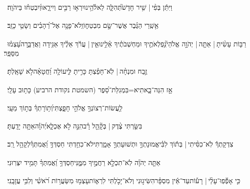 \documentclass[12pt]{article}
\newcommand{\loc}[1]{\textsuperscript{\locf{#1}}}
\begin{document}
{\loc{ ד}~}‏וַיִּתֵּ֬ן בְּפִ֨י |  שִׁ֥יר חָדָשׁ֮{\hfill}תְּהִלָּ֢ה לֵאלֹ֫הֵ֥ינוּ\newline\hspace*{.5em}יִרְא֣וּ רַבִּ֣ים וְיִירָ֑אוּ{\hfill}וְ֝יִבְטְח֗וּ בַּיהֹוָֽה׃\par

{\loc{ ה}~}‏אַ֥שְֽׁרֵי הַגֶּ֗בֶר אֲשֶׁר־שָׂ֣ם  מִבְטַח֑וֹ{\hfill}וְֽלֹא־פָנָ֥ה אֶל־רְ֝הָבִ֗ים וְשָׂטֵ֥י כָזָֽב׃\par

{\loc{ ו}~}‏רַבּ֤וֹת עָשִׂ֨יתָ |  אַתָּ֤ה |  יְהֹוָ֣ה אֱלֹהַי֮{\hfill}נִ֥פְלְאֹתֶ֥יךָ וּמַחְשְׁבֹתֶ֗יךָ אֵ֫לֵ֥ינוּ\newline\hspace*{.5em}אֵ֤ין |  עֲרֹ֬ךְ אֵלֶ֗יךָ אַגִּ֥ידָה וַאֲדַבֵּ֑רָה{\hfill}עָ֝צְמ֗וּ מִסַּפֵּֽר׃\par

{\loc{ ז}~}‏זֶ֤בַח וּמִנְחָ֨ה |  לֹֽא־חָפַ֗צְתָּ{\hfill} כָּרִ֣יתָ לִּ֑י\newline\hspace*{.5em}עוֹלָ֥ה וַ֝חֲטָאָ֗ה{\hfill}לֹ֣א שָׁאָֽלְתָּ׃\par

{\loc{ ח}~}‏אָ֣ז  הִנֵּה־בָ֑אתִי{\hfill}א=בִּמְגִלַּת־סֵ֝פֶר (השמטת נקודת הרביע) כָּת֥וּב עָלָֽי׃\par

{\loc{ ט}~}‏לַ֥עֲשׂוֹת־רְצוֹנְךָ֣ אֱלֹהַ֣י חָפָ֑צְתִּי{\hfill}וְ֝ת֥וֹרָתְךָ֗ בְּת֣וֹךְ מֵעָֽי׃\par

{\loc{ י}~}‏בִּשַּׂ֤רְתִּי צֶ֨דֶק |  בְּקָ֘הָ֤ל רָ֗ב{\hfill}הִנֵּ֣ה  לֹ֣א אֶכְלָ֑א\newline\hspace*{.5em}יְ֝הֹוָ֗ה{\hfill}אַתָּ֥ה יָדָֽעְתָּ׃\par

{\loc{ יא}~}‏צִדְקָתְךָ֬ לֹֽא־כִסִּ֨יתִי |  בְּת֬וֹךְ לִבִּ֗י{\hfill}אֱמוּנָתְךָ֣ וּתְשׁוּעָתְךָ֣ אָמָ֑רְתִּי\newline\hspace*{.5em}לֹא־כִחַ֥דְתִּי חַסְדְּךָ֥ וַ֝אֲמִתְּךָ֗{\hfill}לְקָהָ֥ל רָֽב׃\par

{\loc{ יב}~}‏אַתָּ֤ה יְהֹוָ֗ה לֹֽא־תִכְלָ֣א רַחֲמֶ֣יךָ מִמֶּ֑נִּי{\hfill}חַסְדְּךָ֥ וַ֝אֲמִתְּךָ֗ תָּמִ֥יד יִצְּרֽוּנִי׃\par

{\loc{ יג}~}‏כִּ֤י אָפְﬞפֽוּ־עָלַ֨י |  רָע֡וֹת{\hfill}עַד־אֵ֬ין מִסְפָּ֗ר\newline\hspace*{.5em}הִשִּׂיג֣וּנִי  וְלֹא־יָכֹ֣לְתִּי לִרְא֑וֹת{\hfill}עָצְמ֥וּ מִשַּׂעֲר֥וֹת רֹ֝אשִׁ֗י וְלִבִּ֥י עֲזָבָֽנִי׃\par
\end{document}
